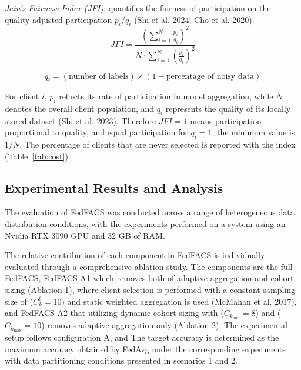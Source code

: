 \documentclass[pdflatex,sn-mathphys-num,oneside]{sn-jnl}%
\theoremstyle{thmstyleone}%
\theoremstyle{thmstyletwo}%
\theoremstyle{thmstylethree}%
\begin{document}
\textit{Jain's Fairness Index (JFI)}: quantifies the fairness of participation on the quality-adjusted participation $p_i/q_i$ (Shi et al. 2024; Cho et al. 2020).
\begin{equation}
JFI = \frac{\left(\sum_{i=1}^{N} \frac{p_i}{q_i}\right)^2}
{N \cdot \sum_{i=1}^{N} \left(\frac{p_i}{q_i}\right)^2}
\label{eq:jfi}
\end{equation}

\begin{equation}
q_i = (\text{number of labels}) \times (1 - \text{percentage of noisy data})
\label{eq:qi}
\end{equation}

For client $i$, $p_i$ reflects its rate of participation in model aggregation, while $N$ denotes the overall client population, and $q_i$ represents the quality of its locally stored dataset (Shi et al. 2023). Therefore $JFI = 1$ means participation proportional to quality, and equal participation for $q_i=1$; the minimum value is $1/N$. The percentage of clients that are never selected is reported with the index (Table~\ref{tab:cost}).

\subsection{Experimental Results and Analysis}

The evaluation of FedFACS was conducted across a range of heterogeneous data distribution conditions, with the experiments performed on a system using an Nvidia RTX 3090 GPU and 32 GB of RAM.

The relative contribution of each component in FedFACS is individually evaluated through a comprehensive ablation study. The components are the full FedFACS, FedFACS-A1 which removes both of adaptive aggregation and cohort sizing (Ablation 1), where client selection is performed with a constant sampling size of ($C_k^t=10$) and static weighted aggregation is used (McMahan et al. 2017), and FedFACS-A2 that utilizing dynamic cohort sizing with ($C_{k_{\min}} = 8$) and ($C_{k_{\max}} = 10$) removes adaptive aggregation only (Ablation 2). The experimental setup follows configuration A, and The target accuracy is determined as the maximum accuracy obtained by FedAvg under the corresponding experiments with data partitioning conditions presented in scenarios 1 and 2.
\end{document}
